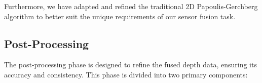 \documentclass[conference]{IEEEtran}
\begin{document}
Furthermore, we have adapted and refined the traditional 2D Papoulis-Gerchberg algorithm to better suit the unique requirements of our sensor fusion task.







\subsection{Post-Processing}

The post-processing phase is designed to refine the fused depth data, ensuring its accuracy and consistency. This phase is divided into two primary components:
\end{document}
